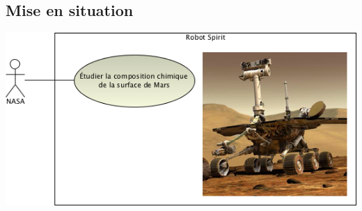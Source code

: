 \documentclass[10pt,fleqn]{article} %
\begin{document}
\def\pathfig{images}

\vspace{4.5cm}
\pagestyle{fancy}
\thispagestyle{plain}

\def\columnseprulecolor{\color{ocre}}
\setlength{\columnseprule}{0.4pt} 

\def\pathfig{images}


\ifprof
\begin{multicols}{2}
\else
\begin{multicols}{2}
\fi

\subsection*{Mise en situation}
\begin{center}
\includegraphics[width=.8\linewidth]{images/fig_01.png}
\end{center}



\end{multicols}
\end{multicols}
\end{document}
